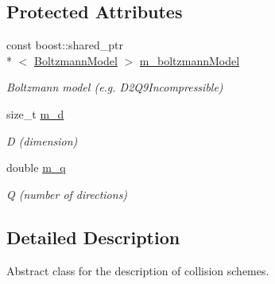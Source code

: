 \subsection*{Protected Attributes}
\begin{DoxyCompactItemize}
\item 
\hypertarget{classnatrium_1_1CollisionModel_a0c77cb3544948bb6d289ea8d47076012}{const boost\-::shared\-\_\-ptr\\*
$<$ \hyperlink{classnatrium_1_1BoltzmannModel}{Boltzmann\-Model} $>$ \hyperlink{classnatrium_1_1CollisionModel_a0c77cb3544948bb6d289ea8d47076012}{m\-\_\-boltzmann\-Model}}\label{classnatrium_1_1CollisionModel_a0c77cb3544948bb6d289ea8d47076012}

\begin{DoxyCompactList}\small\item\em Boltzmann model (e.\-g. D2\-Q9\-Incompressible) \end{DoxyCompactList}\item 
\hypertarget{classnatrium_1_1CollisionModel_ad6dcd37d98c4a462286f41240a918b59}{size\-\_\-t \hyperlink{classnatrium_1_1CollisionModel_ad6dcd37d98c4a462286f41240a918b59}{m\-\_\-d}}\label{classnatrium_1_1CollisionModel_ad6dcd37d98c4a462286f41240a918b59}

\begin{DoxyCompactList}\small\item\em D (dimension) \end{DoxyCompactList}\item 
\hypertarget{classnatrium_1_1CollisionModel_a77470299003744c7c68e3e87383c40d2}{double \hyperlink{classnatrium_1_1CollisionModel_a77470299003744c7c68e3e87383c40d2}{m\-\_\-q}}\label{classnatrium_1_1CollisionModel_a77470299003744c7c68e3e87383c40d2}

\begin{DoxyCompactList}\small\item\em Q (number of directions) \end{DoxyCompactList}\end{DoxyCompactItemize}


\subsection{Detailed Description}
Abstract class for the description of collision schemes. 

